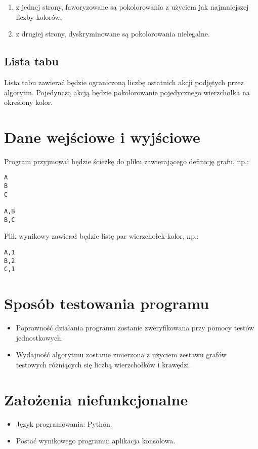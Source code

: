 \documentclass[a4paper,10pt]{article}
\begin{document}
\begin{enumerate}
 \item z jednej strony, faworyzowane są pokolorowania z użyciem jak najmniejszej liczby kolorów,
 \item z drugiej strony, dyskryminowane są pokolorowania nielegalne.
\end{enumerate}

\subsection{Lista tabu}
Lista tabu zawierać będzie ograniczoną liczbę ostatnich akcji podjętych przez algorytm.
Pojedynczą akcją będzie pokolorowanie pojedycznego wierzchołka na określony kolor.


\section{Dane wejściowe i wyjściowe}
Program przyjmował będzie ścieżkę do pliku zawierającego definicję grafu, np.:

\begin{verbatim}
A
B
C

A,B
B,C
\end{verbatim}

Plik wynikowy zawierał będzie listę par wierzchołek-kolor, np.:

\begin{verbatim}
A,1
B,2
C,1
\end{verbatim}



\section{Sposób testowania programu}

\begin{itemize}
 \item Poprawność działania programu zostanie zweryfikowana przy pomocy testów jednostkowych.
 \item Wydajność algorytmu zostanie zmierzona z użyciem zestawu grafów testowych różniących się liczbą wierzchołków i krawędzi.
\end{itemize}







\section{Założenia niefunkcjonalne}

\begin{itemize}
 \item Język programowania: Python.
 \item Postać wynikowego programu: aplikacja konsolowa.
\end{itemize}
\end{document}

